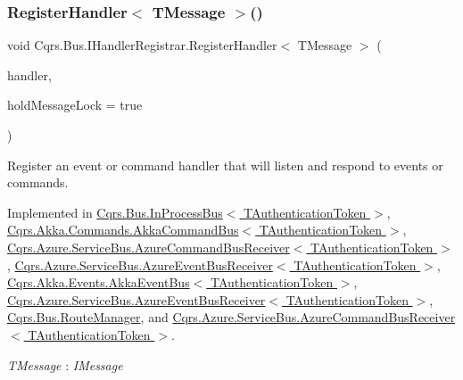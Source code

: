 \subsubsection{\texorpdfstring{Register\+Handler$<$ T\+Message $>$()}{RegisterHandler< TMessage >()}\hspace{0.1cm}{\footnotesize\ttfamily [2/2]}}
{\footnotesize\ttfamily void Cqrs.\+Bus.\+I\+Handler\+Registrar.\+Register\+Handler$<$ T\+Message $>$ (\begin{DoxyParamCaption}\item[{Action$<$ T\+Message $>$}]{handler,  }\item[{bool}]{hold\+Message\+Lock = {\ttfamily true} }\end{DoxyParamCaption})}



Register an event or command handler that will listen and respond to events or commands. 



Implemented in \hyperlink{classCqrs_1_1Bus_1_1InProcessBus_a62171e3c6d155cfdfd921b07b4909adf_a62171e3c6d155cfdfd921b07b4909adf}{Cqrs.\+Bus.\+In\+Process\+Bus$<$ T\+Authentication\+Token $>$}, \hyperlink{classCqrs_1_1Akka_1_1Commands_1_1AkkaCommandBus_adc21072d2b02c745747c4d585a53dba3_adc21072d2b02c745747c4d585a53dba3}{Cqrs.\+Akka.\+Commands.\+Akka\+Command\+Bus$<$ T\+Authentication\+Token $>$}, \hyperlink{classCqrs_1_1Azure_1_1ServiceBus_1_1AzureCommandBusReceiver_a1c9aba2692f51b66921802333433e2f7_a1c9aba2692f51b66921802333433e2f7}{Cqrs.\+Azure.\+Service\+Bus.\+Azure\+Command\+Bus\+Receiver$<$ T\+Authentication\+Token $>$}, \hyperlink{classCqrs_1_1Azure_1_1ServiceBus_1_1AzureEventBusReceiver_a0c4ab01eece7025add9aa9ab4d23111d_a0c4ab01eece7025add9aa9ab4d23111d}{Cqrs.\+Azure.\+Service\+Bus.\+Azure\+Event\+Bus\+Receiver$<$ T\+Authentication\+Token $>$}, \hyperlink{classCqrs_1_1Akka_1_1Events_1_1AkkaEventBus_a6795dfcaf611ce1b50310f442cef0546_a6795dfcaf611ce1b50310f442cef0546}{Cqrs.\+Akka.\+Events.\+Akka\+Event\+Bus$<$ T\+Authentication\+Token $>$}, \hyperlink{classCqrs_1_1Azure_1_1ServiceBus_1_1AzureEventBusReceiver_a0c4ab01eece7025add9aa9ab4d23111d_a0c4ab01eece7025add9aa9ab4d23111d}{Cqrs.\+Azure.\+Service\+Bus.\+Azure\+Event\+Bus\+Receiver$<$ T\+Authentication\+Token $>$}, \hyperlink{classCqrs_1_1Bus_1_1RouteManager_aeb620222dd0351a6d3848caf93e29954_aeb620222dd0351a6d3848caf93e29954}{Cqrs.\+Bus.\+Route\+Manager}, and \hyperlink{classCqrs_1_1Azure_1_1ServiceBus_1_1AzureCommandBusReceiver_a1c9aba2692f51b66921802333433e2f7_a1c9aba2692f51b66921802333433e2f7}{Cqrs.\+Azure.\+Service\+Bus.\+Azure\+Command\+Bus\+Receiver$<$ T\+Authentication\+Token $>$}.

\begin{Desc}
\item[Type Constraints]\begin{description}
\item[{\em T\+Message} : {\em I\+Message}]\end{description}
\end{Desc}
